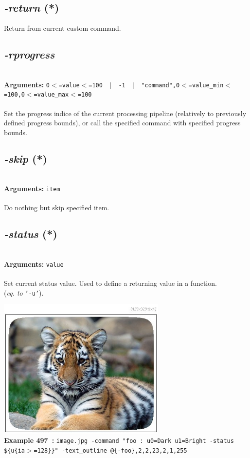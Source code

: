 \documentclass[a4paper,11pt,twoside]{book}
\begin{document}
\subsection{\emph{-return} (*)}\vspace*{-0.5em}
Return from current custom command.


\subsection{\emph{-rprogress} }\vspace*{-0.5em}
~\\\textbf{Arguments: } 
{\small \texttt{0$<$=value$<$=100 ~$|$~ -1 ~$|$~ "command",0$<$=value\_min$<$=100,0$<$=value\_max$<$=100}}\\~\\
Set the progress indice of the current processing pipeline (relatively to
previously defined progress bounds), or call the specified command with
specified progress bounds.


\subsection{\emph{-skip} (*)}\vspace*{-0.5em}
~\\\textbf{Arguments: } 
{\small \texttt{item}}\\~\\
Do nothing but skip specified item.


\subsection{\emph{-status} (*)}\vspace*{-0.5em}
~\\\textbf{Arguments: } 
{\small \texttt{value}}\\~\\
Set current status value. Used to define a returning value in a function.
~\\(\emph{eq. to} {\small \texttt{'-u'}}).
\begin{center}\includegraphics[keepaspectratio=true,height=7cm,width=\textwidth]{img/gmic_def497.jpg}\\
{\footnotesize \textbf{Example 497~:} \texttt{image.jpg -command "foo : u0=Dark u1=Bright -status \$\{u\{ia$>$=128\}\}" -text\_outline @\{-foo\},2,2,23,2,1,255}}
\end{center}
\end{document}
